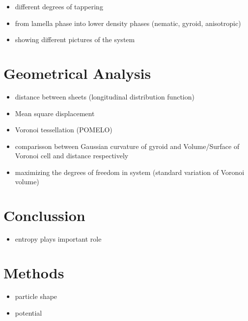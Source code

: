 \documentclass[epj,twocolumn]{webofc}
\begin{document}
\begin{itemize}
    \item different degrees of tappering
    \item from lamella phase into lower density phases (nematic, gyroid, anisotropic)
    \item showing different pictures of the system
\end{itemize}

\section{Geometrical Analysis}
\label{sec:GeometricalAnalysis}

\begin{itemize}
    \item distance between sheets (longitudinal distribution function)
    \item Mean square displacement
    \item Voronoi tessellation (POMELO)
    \item comparisson between Gaussian curvature of gyroid and Volume/Surface of Voronoi cell and distance respectively
    \item maximizing the degrees of freedom in system (standard variation of Voronoi volume)
\end{itemize}

\section{Conclussion}
\label{sec:Conclussion}

\begin{itemize}
    \item entropy plays important role
\end{itemize}

\section{Methods}
\label{sec:Methods}

\begin{itemize}
    \item particle shape
    \item potential
\end{itemize}
\end{document}
